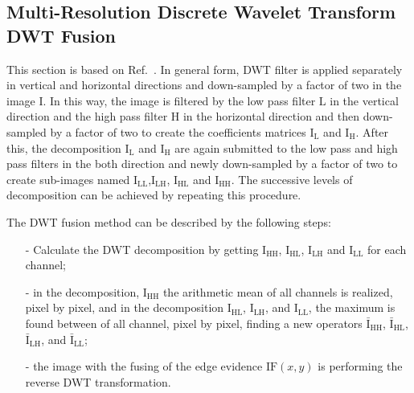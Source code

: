 \documentclass[conference]{IEEEtran}
\begin{document}
\subsection{Multi-Resolution Discrete Wavelet Transform DWT Fusion} 
This section is based on Ref.~\cite{n_r}. In general form, DWT filter is applied separately in vertical and horizontal directions and down-sampled by a factor of two in the image I. In this way, the image is filtered by the low pass filter $\text{L}$ in the vertical direction and the high pass filter $\text{H}$ in the horizontal direction and then down-sampled by a factor of two to create the coefficients matrices $\text{I}_\text{L}$ and $\text{I}_\text{H}$. After this, the decomposition $\text{I}_\text{L}$ and $\text{I}_\text{H}$ are again submitted to the low pass and high pass filters in the both direction and newly down-sampled by a factor of two to create sub-images named $\text{I}_\text{LL}$,$\text{I}_\text{LH}$, $\text{I}_\text{HL}$ and $\text{I}_\text{HH}$. The successive levels of decomposition can be achieved by repeating this procedure.

The DWT fusion method can be described by the following steps:
\begin{itemize}
\item[-] Calculate the DWT decomposition by getting $\text{I}_\text{HH}$, $\text{I}_\text{HL}$, $\text{I}_\text{LH}$ and $\text{I}_\text{LL}$ for each channel;
\item[-] in the decomposition, $\text{I}_\text{HH}$ the arithmetic mean of all channels is realized, pixel by pixel, and in the decomposition $\text{I}_\text{HL}$, $\text{I}_\text{LH}$, and $\text{I}_\text{LL}$, the maximum is found between of all channel, pixel by pixel, finding a new operators $\bar{\text{I}}_\text{HH}$, $\bar{\text{I}}_\text{HL}$, $\bar{\text{I}}_\text{LH}$, and $\bar{\text{I}}_\text{LL}$;
\item[-] the image with the fusing of the edge evidence $\text{IF}(x,y)$ is performing the reverse DWT transformation.  
\end{itemize}
\end{document}
